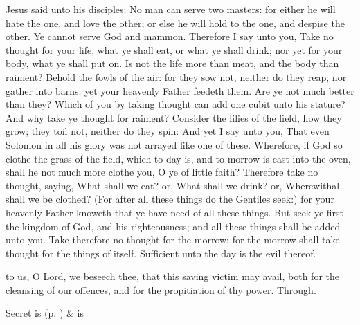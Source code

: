  Jesus said unto his disciples: No man can serve two masters: for either he will hate the one, and love the other; or else he will hold to the one, and despise the other. Ye cannot serve God and mammon. Therefore I say unto you, Take no thought for your life, what ye shall eat, or what ye shall drink; nor yet for your body, what ye shall put on. Is not the life more than meat, and the body than raiment? Behold the fowls of the air: for they sow not, neither do they reap, nor gather into barns; yet your heavenly Father feedeth them. Are ye not much better than they? Which of you by taking thought can add one cubit unto his stature? And why take ye thought for raiment? Consider the lilies of the field, how they grow; they toil not, neither do they spin: And yet I say unto you, That even Solomon in all his glory was not arrayed like one of these. Wherefore, if God so clothe the grass of the field, which to day is, and to morrow is cast into the oven, shall he not much more clothe you, O ye of little faith? Therefore take no thought, saying, What shall we eat? or, What shall we drink? or, Wherewithal shall we be clothed? (For after all these things do the Gentiles seek:) for your heavenly Father knoweth that ye have need of all these things. But seek ye first the kingdom of God, and his righteousness; and all these things shall be added unto you. Take therefore no thought for the morrow: for the morrow shall take thought for the things of itself. Sufficient unto the day is the evil thereof.


\vspace{-0.3\baselineskip}

\secret
{} to us, O Lord, we beseech thee, that this saving victim may avail, both for the cleansing of our offences, and for the propitiation of thy power. Through.
\begin{rubric}
     Secret is  (p. \pageref{SPSaints}) \&  is 
\end{rubric}


\vspace{-0.3\baselineskip}

